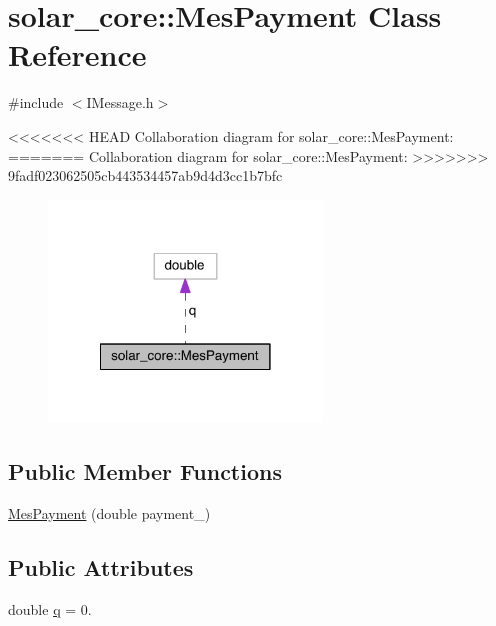 \hypertarget{classsolar__core_1_1_mes_payment}{}\section{solar\+\_\+core\+:\+:Mes\+Payment Class Reference}
\label{classsolar__core_1_1_mes_payment}


{\ttfamily \#include $<$I\+Message.\+h$>$}



<<<<<<< HEAD
Collaboration diagram for solar\+\_\+core\+:\+:Mes\+Payment\+:\nopagebreak
=======
Collaboration diagram for solar\+\_\+core\+:\+:Mes\+Payment\+:
\nopagebreak
>>>>>>> 9fadf023062505cb443534457ab9d4d3cc1b7bfc
\begin{figure}[H]
\begin{center}
\leavevmode
\includegraphics[width=206pt]{classsolar__core_1_1_mes_payment__coll__graph}
\end{center}
\end{figure}
\subsection*{Public Member Functions}
\begin{DoxyCompactItemize}
\item 
\hyperlink{classsolar__core_1_1_mes_payment_a1f1892acd5c8da372d061a69445d68bd}{Mes\+Payment} (double payment\+\_\+)
\end{DoxyCompactItemize}
\subsection*{Public Attributes}
\begin{DoxyCompactItemize}
\item 
double \hyperlink{classsolar__core_1_1_mes_payment_a5d137def5ff6f3659650c08f90d07ca2}{q} = 0.
\end{DoxyCompactItemize}



